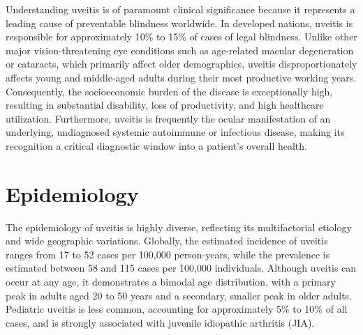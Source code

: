 Understanding uveitis is of paramount clinical significance because it represents a leading cause of preventable blindness worldwide. In developed nations, uveitis is responsible for approximately 10\% to 15\% of cases of legal blindness. Unlike other major vision-threatening eye conditions such as age-related macular degeneration or cataracts, which primarily affect older demographics, uveitis disproportionately affects young and middle-aged adults during their most productive working years. Consequently, the socioeconomic burden of the disease is exceptionally high, resulting in substantial disability, loss of productivity, and high healthcare utilization. Furthermore, uveitis is frequently the ocular manifestation of an underlying, undiagnosed systemic autoimmune or infectious disease, making its recognition a critical diagnostic window into a patient's overall health.

\section*{Epidemiology}
The epidemiology of uveitis is highly diverse, reflecting its multifactorial etiology and wide geographic variations. Globally, the estimated incidence of uveitis ranges from 17 to 52 cases per 100,000 person-years, while the prevalence is estimated between 58 and 115 cases per 100,000 individuals. Although uveitis can occur at any age, it demonstrates a bimodal age distribution, with a primary peak in adults aged 20 to 50 years and a secondary, smaller peak in older adults. Pediatric uveitis is less common, accounting for approximately 5\% to 10\% of all cases, and is strongly associated with juvenile idiopathic arthritis (JIA).

